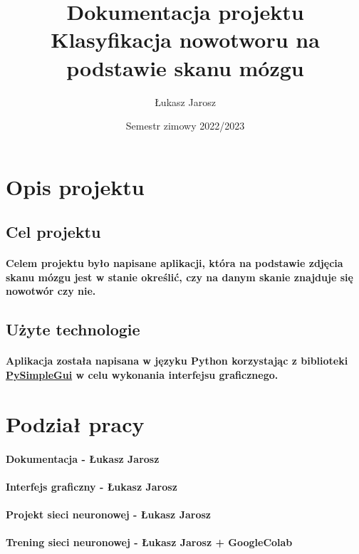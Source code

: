 \documentclass[a4paper,12pt]{article}
\title{Dokumentacja projektu \\ \large Klasyfikacja nowotworu na podstawie skanu mózgu}
\author{Łukasz Jarosz}
\date{Semestr zimowy 2022/2023}
\begin{document}
\begin{sloppypar}
\maketitle

\newpage
\tableofcontents
\newpage
{}


\section{Opis projektu}

\subsection{Cel projektu}
\paragraph{Celem projektu było napisane aplikacji, która na podstawie zdjęcia skanu mózgu jest w stanie określić, czy na danym skanie znajduje się nowotwór czy nie.}

\subsection{Użyte technologie}
\paragraph{Aplikacja została napisana w języku Python korzystając z biblioteki \href{https://www.pysimplegui.org/en/latest/}{PySimpleGui} w celu wykonania interfejsu graficznego.}


\section{Podział pracy}

\paragraph{Dokumentacja - Łukasz Jarosz}
\paragraph{Interfejs graficzny - Łukasz Jarosz}
\paragraph{Projekt sieci neuronowej - Łukasz Jarosz}
\paragraph{Trening sieci neuronowej - Łukasz Jarosz + GoogleColab}

\end{sloppypar}
\end{document}
